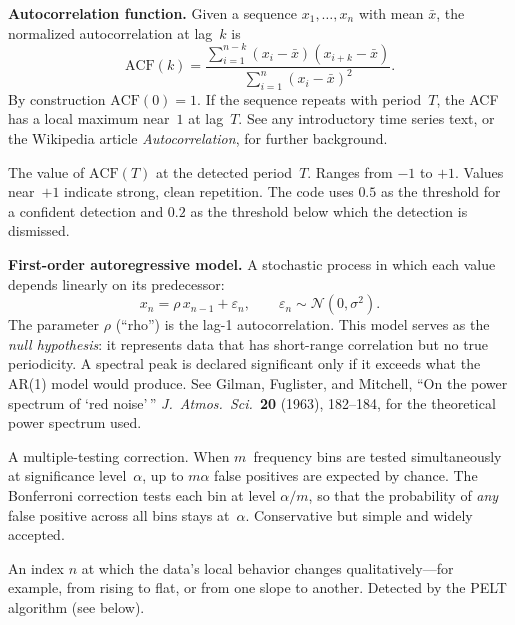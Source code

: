 \documentclass[11pt]{article}
\begin{document}
\begin{description}[style=nextline, leftmargin=3cm]

\item[ACF] \textbf{Autocorrelation function.}  Given a sequence
  $x_1, \ldots, x_n$ with mean $\bar{x}$, the normalized autocorrelation
  at lag~$k$ is
  \[
    \mathrm{ACF}(k)
      = \frac{\sum_{i=1}^{n-k}(x_i - \bar{x})(x_{i+k} - \bar{x})}
             {\sum_{i=1}^{n}(x_i - \bar{x})^2}.
  \]
  By construction $\mathrm{ACF}(0) = 1$.  If the sequence repeats with
  period~$T$, the ACF has a local maximum near~$1$ at lag~$T$.
  See any introductory time series text, or the Wikipedia article
  \emph{Autocorrelation}, for further background.

\item[ACF strength] The value of $\mathrm{ACF}(T)$ at the detected
  period~$T$.  Ranges from $-1$ to $+1$.  Values near~$+1$ indicate
  strong, clean repetition.  The code uses $0.5$ as the threshold for a
  confident detection and $0.2$ as the threshold below which
  the detection is dismissed.

\item[AR(1)] \textbf{First-order autoregressive model.}  A stochastic
  process in which each value depends linearly on its predecessor:
  \[
    x_n = \rho\, x_{n-1} + \varepsilon_n, \qquad
    \varepsilon_n \sim \mathcal{N}(0, \sigma^2).
  \]
  The parameter $\rho$ (``rho'') is the lag-1 autocorrelation.
  This model serves as the \emph{null hypothesis}: it represents data that
  has short-range correlation but no true periodicity.  A spectral peak
  is declared significant only if it exceeds what the AR(1) model would
  produce.  See Gilman, Fuglister, and Mitchell, ``On the power spectrum
  of `red noise'\,'' \emph{J.\ Atmos.\ Sci.}\ \textbf{20} (1963),
  182--184, for the theoretical power spectrum used.

\item[Bonferroni correction] A multiple-testing correction.  When
  $m$~frequency bins are tested simultaneously at significance
  level~$\alpha$, up to $m\alpha$ false positives are expected by chance.
  The Bonferroni correction tests each bin at level $\alpha/m$, so that
  the probability of \emph{any} false positive across all bins stays
  at~$\alpha$.  Conservative but simple and widely accepted.

\item[Breakpoint] An index $n$ at which the data's local behavior changes
  qualitatively---for example, from rising to flat, or from one slope to
  another.  Detected by the PELT algorithm (see below).


\end{description}
\end{document}
